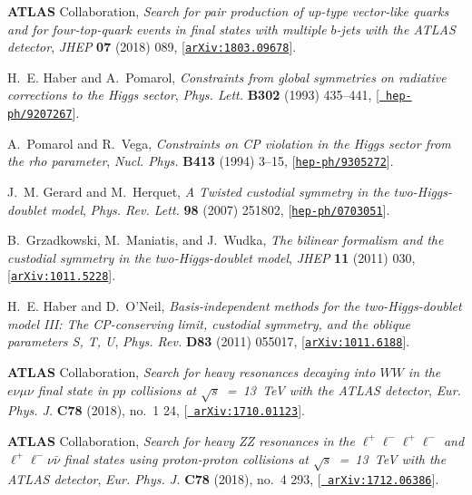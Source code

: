 \documentclass[review]{elsarticle}
\begin{document}
\begin{thebibliography}{100}
{\bf ATLAS} Collaboration, {\it {Search for pair production
  of up-type vector-like quarks and for four-top-quark events in final states
  with multiple $b$-jets with the ATLAS detector}},  {\em JHEP} {\bf 07} (2018)
  089, [\href{http://arxiv.org/abs/1803.09678}{{\tt arXiv:1803.09678}}].

H.~E. Haber and A.~Pomarol, {\it {Constraints from global symmetries on
  radiative corrections to the Higgs sector}},  {\em Phys. Lett.} {\bf B302}
  (1993) 435--441, [\href{http://arxiv.org/abs/hep-ph/9207267}{{\tt
  hep-ph/9207267}}].

A.~Pomarol and R.~Vega, {\it {Constraints on CP violation in the Higgs sector
  from the rho parameter}},  {\em Nucl. Phys.} {\bf B413} (1994) 3--15,
  [\href{http://arxiv.org/abs/hep-ph/9305272}{{\tt hep-ph/9305272}}].

J.~M. Gerard and M.~Herquet, {\it {A Twisted custodial symmetry in the
  two-Higgs-doublet model}},  {\em Phys. Rev. Lett.} {\bf 98} (2007) 251802,
  [\href{http://arxiv.org/abs/hep-ph/0703051}{{\tt hep-ph/0703051}}].

B.~Grzadkowski, M.~Maniatis, and J.~Wudka, {\it {The bilinear formalism and the
  custodial symmetry in the two-Higgs-doublet model}},  {\em JHEP} {\bf 11}
  (2011) 030, [\href{http://arxiv.org/abs/1011.5228}{{\tt arXiv:1011.5228}}].

H.~E. Haber and D.~O'Neil, {\it {Basis-independent methods for the
  two-Higgs-doublet model III: The CP-conserving limit, custodial symmetry, and
  the oblique parameters S, T, U}},  {\em Phys. Rev.} {\bf D83} (2011) 055017,
  [\href{http://arxiv.org/abs/1011.6188}{{\tt arXiv:1011.6188}}].

{\bf ATLAS} Collaboration, {\it {Search for heavy resonances
  decaying into $WW$ in the $e\nu\mu\nu$ final state in $pp$ collisions at
  $\sqrt{s}$~=~13~TeV with the ATLAS detector}},  {\em Eur. Phys. J.} {\bf C78}
  (2018), no.~1 24, [\href{http://arxiv.org/abs/1710.01123}{{\tt
  arXiv:1710.01123}}].

{\bf ATLAS} Collaboration, {\it {Search for heavy ZZ
  resonances in the $\ell ^+\ell ^-\ell ^+\ell ^-$ and $\ell ^+\ell ^-\nu
  \bar{\nu }$ final states using proton-proton collisions at $\sqrt{s}$~=~13~TeV 
  with the ATLAS detector}},  {\em Eur. Phys. J.} {\bf C78}
  (2018), no.~4 293, [\href{http://arxiv.org/abs/1712.06386}{{\tt
  arXiv:1712.06386}}].


\end{thebibliography}
\end{document}
